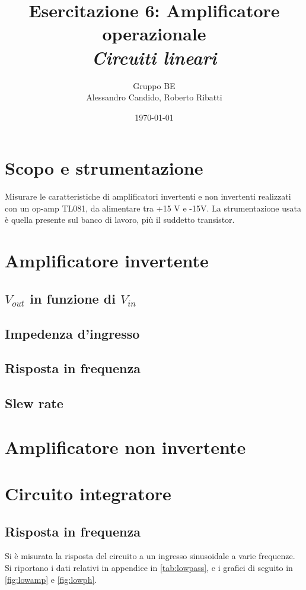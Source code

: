 \documentclass[10pt,a4paper]{article}
\title{Esercitazione 6: Amplificatore operazionale\\ \Large{\emph{Circuiti lineari}}}
\author{Gruppo BE \\ Alessandro Candido, Roberto Ribatti}
\date{\today}
\begin{document}
\maketitle

\section{Scopo e strumentazione}
Misurare le caratteristiche di amplificatori invertenti e non invertenti realizzati con un op-amp TL081, da alimentare tra +15 V e -15V.
La strumentazione usata è quella presente sul banco di lavoro, più il suddetto transistor.

\section{Amplificatore invertente}

\subsection{$V_{out}$ in funzione di $V_{in}$}

\subsection{Impedenza d'ingresso}

\subsection{Risposta in frequenza}

\subsection{Slew rate}

\section{Amplificatore non invertente}

\section{Circuito integratore}

\subsection{Risposta in frequenza}
Si è misurata la risposta del circuito a un ingresso sinusoidale a varie frequenze. Si riportano i dati relativi in appendice in \tablename{\ref{tab:lowpass}}, e i grafici di seguito in \figurename{\ref{fig:lowamp}} e \figurename{\ref{fig:lowph}}.
\end{document}

